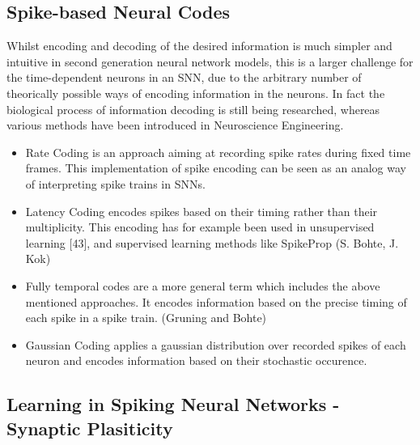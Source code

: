 \documentclass[letterpaper, 10 pt, conference]{ieeeconf}  %
\begin{document}
\subsection{Spike-based Neural Codes}

Whilst encoding and decoding of the desired information is much simpler and intuitive in second generation neural network models,
this is a larger challenge for the time-dependent neurons in an SNN, due to the arbitrary 
number of theorically possible ways of encoding information in the neurons. In fact the biological process of information decoding is 
still being researched, whereas various methods have been introduced in Neuroscience Engineering.

\begin{itemize}

        \item Rate Coding is an approach aiming at recording spike rates during fixed time frames. This implementation of spike encoding can be seen as an analog way of interpreting spike trains in SNNs.
        \item Latency Coding encodes spikes based on their timing rather than their multiplicity. This encoding has for example been used in unsupervised learning [43], and
        supervised learning methods like SpikeProp (S. Bohte, J. Kok)
        \item Fully temporal codes are a more general term which includes the above mentioned approaches. It encodes information based on the precise
        timing of each spike in a spike train. (Gruning and Bohte)
        \item Gaussian Coding applies a gaussian distribution over recorded spikes of each neuron and encodes information based on their stochastic occurence.
\end{itemize}        

\subsection{Learning in Spiking Neural Networks - Synaptic Plasiticity}
\end{document}

